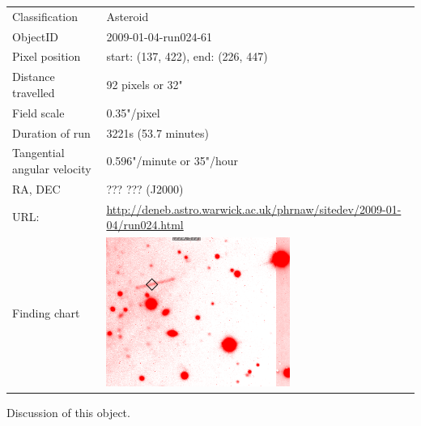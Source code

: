   \begin{tabular}{l l}
  Classification & Asteroid \\
  ObjectID & 2009-01-04-run024-61 \\
  Pixel position & start: (137, 422), end: (226, 447) \\
  Distance travelled & 92 pixels or 32" \\
  Field scale & 0.35"/pixel \\
  Duration of run & 3221s (53.7 minutes) \\
  Tangential angular velocity & 0.596"/minute or 35"/hour\\ 
  RA, DEC & ??? ??? (J2000) \\
  URL: & \small \url{http://deneb.astro.warwick.ac.uk/phrnaw/sitedev/2009-01-04/run024.html} \\
  Finding chart & \includegraphics[width=60mm]{images/2009-01-04-run024-61.png} \\
  \end{tabular}
  Discussion of this object.
  